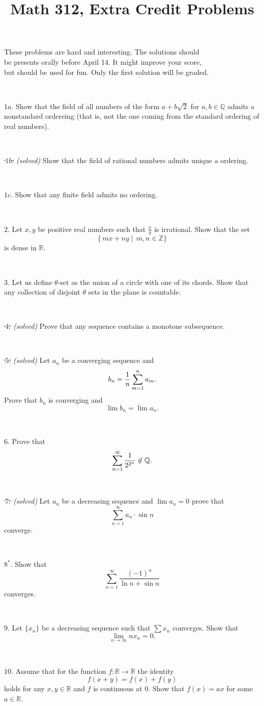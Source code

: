 \documentclass{article}
\def\noi{\noindent}%
\def\RR{\mathbb{R}}%
\def\ZZ{\mathbb{Z}}%
\def\QQ{\mathbb{Q}}%
\begin{document}
\title{Math 312, Extra Credit Problems}
\author{}
\date{}
\maketitle

\begin{center}
{\small These problems are hard and interesting. The solutions should \\
be presents orally before April 14. It might improve your score,\\
but should be used for fun. Only the first solution will be graded.}
\end{center}
\thispagestyle{empty}

\ 

\noi $1a$. Show that the field of all numbers of the form $a+b\sqrt{2}$ for $a,b\in \QQ$ admits a nonstandard ordereing (that is, not the one coming from the standard ordering of real numbers).

\ 

\noi \sout{\,$1b$.} \textit{(solved)} Show that the field of rational numbers admits unique a ordering.

\ 

\noi $1c$. Show that any finite field admits no ordering.

\ 

\noi $2$. Let $x,y$ be positive real numbers such that $\tfrac xy$ is irrational.
Show that the set 
\[\{\,mx+ny\mid\,m,n\in\ZZ\}\] 
is dense in $\RR$.

\ 

\noi $3$. Let us define $\theta$-set as the union of a circle with one of its chords.
Show that any collection of disjoint $\theta$ sets in the plane is countable.

\ 

\noi \sout{\,$4$.} \textit{(solved)}  Prove that any sequence contains a monotone subsequence.

\ 

\noi \sout{\,$5$.} \textit{(solved)} Let $a_n$ be a converging sequence and 
$$b_n={1\over n}\sum_{m=1}^n a_m.$$
Prove that $b_n$ is converging and 
$$\lim b_n=\lim a_n.$$

\ 

\noi $6$. Prove that 
$$\sum_{n=1}^\infty {1\over 2^{2^n}}\not\in \QQ.$$

\ 

\noi \sout{\,$7$.} \textit{(solved)} Let $a_n$ be a decreasing sequence and $\lim a_n=0$ prove that 
$$\sum_{n=1}^\infty  a_n\cdot\sin n$$ 
converge.

\ 

\noi $8^*\!$. Show that 
$$\sum_{n=1}^\infty  \frac{(-1)^n}{\ln n+\sin n}$$ 
converges.

\ 

\noi $9$.
Let $\{ x_n \}$ be a decreasing sequence such that $\sum x_n$ converges.
Show that 
\[\lim_{n\to\infty} n x_n = 0.\]

\ 

\noi $10$.
Assume that for the function $f \colon \RR \to \RR$ the identity
\[f(x+y) = f(x) + f(y)\]
holds for any $x,y\in\RR$ and $f$ is continuous at $0$.
Show that $f(x) = ax$ for some $a \in \RR$.
\end{document}
